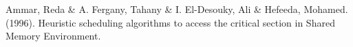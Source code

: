 \documentclass[letterpaper,12pt]{article}
\begin{document}

\begin{thebibliography}{99}

Ammar, Reda \& A. Fergany, Tahany \& I. El-Desouky, Ali \& Hefeeda, Mohamed. (1996). Heuristic scheduling algorithms to access the critical section in Shared Memory Environment. 

\end{thebibliography}
\end{document}
